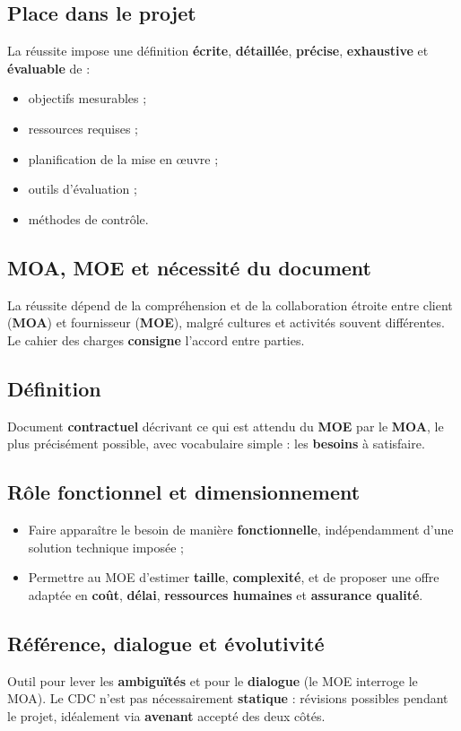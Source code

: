 \documentclass[11pt,a4paper]{article}
\begin{document}
\subsection{Place dans le projet}
La réussite impose une définition \textbf{écrite}, \textbf{détaillée}, \textbf{précise}, \textbf{exhaustive} et \textbf{évaluable} de :
\begin{itemize}[nosep]
  \item objectifs mesurables ;
  \item ressources requises ;
  \item planification de la mise en \oe uvre ;
  \item outils d'évaluation ;
  \item méthodes de contrôle.
\end{itemize}

\subsection{MOA, MOE et nécessité du document}
La réussite dépend de la compréhension et de la collaboration étroite entre client (\textbf{MOA}) et fournisseur (\textbf{MOE}), malgré cultures et activités souvent différentes. Le cahier des charges \textbf{consigne} l'accord entre parties.

\subsection{Définition}
Document \textbf{contractuel} décrivant ce qui est attendu du \textbf{MOE} par le \textbf{MOA}, le plus précisément possible, avec vocabulaire simple : les \textbf{besoins} à satisfaire.

\subsection{Rôle fonctionnel et dimensionnement}
\begin{itemize}[nosep]
  \item Faire apparaître le besoin de manière \textbf{fonctionnelle}, indépendamment d'une solution technique imposée ;
  \item Permettre au MOE d'estimer \textbf{taille}, \textbf{complexité}, et de proposer une offre adaptée en \textbf{coût}, \textbf{délai}, \textbf{ressources humaines} et \textbf{assurance qualité}.
\end{itemize}

\subsection{Référence, dialogue et évolutivité}
Outil pour lever les \textbf{ambiguïtés} et pour le \textbf{dialogue} (le MOE interroge le MOA). Le CDC n'est pas nécessairement \textbf{statique} : révisions possibles pendant le projet, idéalement via \textbf{avenant} accepté des deux côtés.
\end{document}
